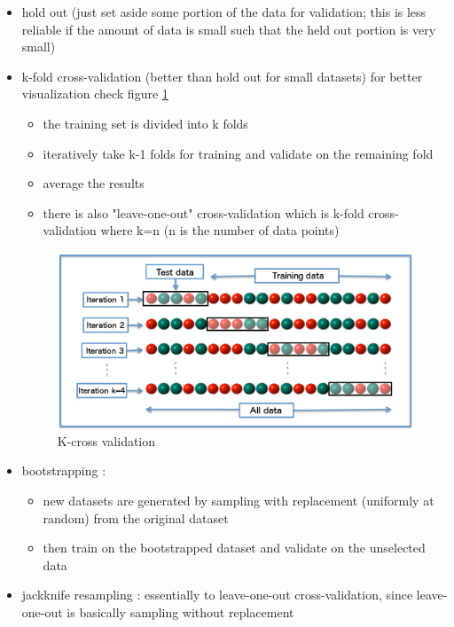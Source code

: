 \begin{itemize}
\item hold out (just set aside some portion of the data for validation; this is less reliable if the amount of data is small such that the held out portion is very small) 
\item k-fold cross-validation (better than hold out for small datasets) for better visualization  check figure \ref{fig:cross}
\begin{itemize}
\item the training set is divided into k folds
\item iteratively take k-1 folds for training and validate on the remaining fold
\item average the results
\item there is also "leave-one-out" cross-validation which is k-fold cross-validation where k=n (n is the number of data points)
\end{itemize}

\begin{figure}[H]
\centering
\includegraphics[width=1.0\textwidth]{img/cross.jpg}
\caption{K-cross validation }
\label{fig:cross}
\end{figure}


\item bootstrapping : 
\begin{itemize}
\item new datasets are generated by sampling with replacement (uniformly at random) from the original dataset
\item then train on the bootstrapped dataset and validate on the unselected data
\end{itemize}
\item jackknife resampling : 
essentially to leave-one-out cross-validation, since leave-one-out is basically sampling without replacement
\end{itemize}


